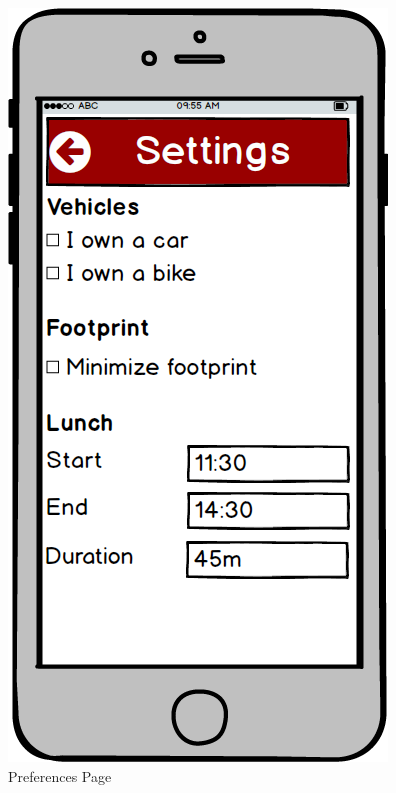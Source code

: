 \begin{figure}[!htb]
\begin{minipage}[b]{0.3\textwidth}
	\includegraphics[scale=0.3]{images/Preferences}
	\caption{Preferences Page}
	\label{ref:preferences}
\end{minipage}
\hfill
\begin{minipage}[b]{0.3\textwidth}
	\centering

\end{minipage}
\end{figure}
